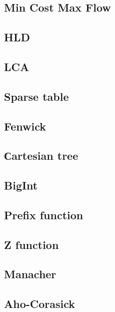 \documentclass{article}
\begin{document}
\begin{multicols}{2}
\subsection{Min Cost Max Flow}

\subsection{HLD}

\subsection{LCA}

\subsection{Sparse table}

\subsection{Fenwick}

\subsection{Сartesian tree}

\subsection{BigInt}

\subsection{Prefix function}

\subsection{Z function}

\subsection{Manacher}

\subsection{Aho-Corasick}


\end{multicols}
\end{document}
